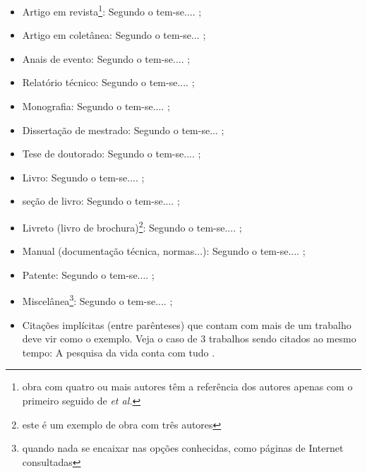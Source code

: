 \documentclass[
	article,			%
	11pt,				%
	oneside,			%
	a4paper,			%
	chapter=TITLE,
	english,			%
	brazil,				%
	sumario=tradicional
	]{templateimtec}
\begin{document}
  	\begin{itemize}
  	\item Artigo em revista\footnote{obra com quatro ou mais autores têm a referência dos autores apenas com o primeiro seguido de \textit{et al.}}: Segundo o  tem-se.... \cite{silva:artigo,artigo1};

  	\item Artigo em coletânea: Segundo o  tem-se... \cite{silva:incollection};

  	\item Anais de evento: Segundo o  tem-se.... \cite{silva:inproceedings};

  	\item Relatório técnico: Segundo o  tem-se.... \cite{silva:tech};

  	\item Monografia: Segundo o  tem-se.... \cite{silva:monography};

  	\item Dissertação de mestrado: Segundo o  tem-se... \cite{silva:master};

  	\item Tese de doutorado: Segundo o  tem-se.... \cite{barcelos1998};

  	
  	\item Livro: Segundo o  tem-se.... \cite{wazlawick:2009};


  	\item seção de livro: Segundo o  tem-se.... \cite{silva:inbook};

  	\item Livreto (livro de brochura)\footnote{este é um exemplo de obra com três autores}: Segundo o  tem-se.... \cite{silva:booklet};

  	\item Manual (documentação técnica, normas...): Segundo o  tem-se.... \cite{NBR6023:2000};

  	\item Patente: Segundo o  tem-se.... \cite{cruvinel1989};

  	\item Miscelânea\footnote{quando nada se encaixar nas opções conhecidas, como páginas de Internet consultadas}: Segundo o  tem-se.... \cite{araujo:2015:classe_abnt2};

  	\item Citações implícitas (entre parênteses) que contam com mais de um trabalho deve vir como o exemplo. Veja o caso de 3 trabalhos sendo citados ao mesmo tempo: A pesquisa da vida conta com tudo \cite{silva:incollection,silva:artigo, cruvinel1989}.

  	\end{itemize}
\end{document}
